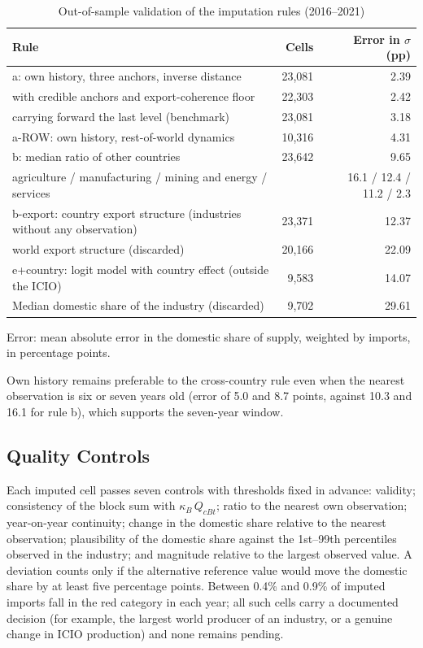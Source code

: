 \documentclass[final,1p,times,authoryear]{elsarticle}
\begin{document}
\begin{table}[!t]
\caption{Out-of-sample validation of the imputation rules (2016--2021)}\label{tab:diag-validation}
\centering
\footnotesize
\begin{tabularx}{\textwidth}{@{}Xrr@{}}
\toprule
\textbf{Rule} & \textbf{Cells} & \textbf{Error in $\sigma$ (pp)} \\
\midrule
a: own history, three anchors, inverse distance & 23,081 & 2.39 \\
\quad with credible anchors and export-coherence floor & 22,303 & 2.42 \\
\quad carrying forward the last level (benchmark) & 23,081 & 3.18 \\
a-ROW: own history, rest-of-world dynamics & 10,316 & 4.31 \\
b: median ratio of other countries & 23,642 & 9.65 \\
\quad agriculture / manufacturing / mining and energy / services & & 16.1 / 12.4 / 11.2 / 2.3 \\
b-export: country export structure (industries without any observation) & 23,371 & 12.37 \\
\quad world export structure (discarded) & 20,166 & 22.09 \\
e+country: logit model with country effect (outside the ICIO) & 9,583 & 14.07 \\
Median domestic share of the industry (discarded) & 9,702 & 29.61 \\
\bottomrule
\end{tabularx}
\par\smallskip\parbox{\linewidth}{\footnotesize Error: mean absolute error in the domestic share of supply, weighted by imports, in percentage points.}
\end{table}

Own history remains preferable to the cross-country rule even when the nearest observation is six or seven years old (error of 5.0 and 8.7 points, against 10.3 and 16.1 for rule b), which supports the seven-year window.

\subsection{Quality Controls}
Each imputed cell passes seven controls with thresholds fixed in advance: validity; consistency of the block sum with $\kappa_B\,Q_{cBt}$; ratio to the nearest own observation; year-on-year continuity; change in the domestic share relative to the nearest observation; plausibility of the domestic share against the 1st--99th percentiles observed in the industry; and magnitude relative to the largest observed value. A deviation counts only if the alternative reference value would move the domestic share by at least five percentage points. Between 0.4\% and 0.9\% of imputed imports fall in the red category in each year; all such cells carry a documented decision (for example, the largest world producer of an industry, or a genuine change in ICIO production) and none remains pending.
\end{document}
